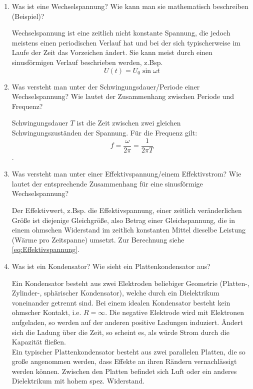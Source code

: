 \begin{enumerate}
 \item Was ist eine Wechselspannung? Wie kann man sie mathematisch beschreiben (Beispiel)? 
		\begin{solution}
			Wechselspannung ist eine zeitlich nicht konstante Spannung, die jedoch meistens einen periodischen Verlauf hat und bei der sich typischerweise im Laufe der Zeit das Vorzeichen ändert. Sie kann meist durch einen sinusförmigen Verlauf beschrieben werden, z.Bsp.
			\begin{equation*}
				U(t) = U_0 \sin\omega t
			\end{equation*}
		\end{solution}
 \item Was versteht man unter der Schwingungsdauer/Periode einer Wechselspannung? Wie lautet der Zusammenhang zwischen Periode und Frequenz?
		\begin{solution}
			Schwingungsdauer $T$ ist die Zeit zwischen zwei gleichen Schwingungszuständen der Spannung. Für die Frequenz gilt: $$f = \frac{\omega}{2\pi} = \frac{1}{2\pi T}$$.
		\end{solution}
 \item Was versteht man unter einer Effektivspannung/einem Effektivstrom? Wie lautet der entsprechende Zusammenhang für eine sinusförmige Wechselspannung?
		\begin{solution}
			Der Effektivwert, z.Bsp. die Effektivspannung, einer zeitlich veränderlichen Größe ist diejenige Gleichgröße, also Betrag einer Gleichspannung, die in einem ohmschen Widerstand im zeitlich konstanten Mittel dieselbe Leistung (Wärme pro Zeitspanne) umsetzt. Zur Berechnung siehe \ref{eq:Effektivspannung}.
		\end{solution}
 \item Was ist ein Kondensator? Wie sieht ein Plattenkondensator aus?
		\begin{solution}
			Ein Kondensator besteht aus zwei Elektroden beliebiger Geometrie (Platten-, Zylinder-, sphärischer Kondensator), welche durch ein Dielektrikum voneinander getrennt sind. Bei einem idealen Kondensator besteht kein ohmscher Kontakt, i.e. $R=\infty$. Die negative Elektrode wird mit Elektronen aufgeladen, so werden auf der anderen positive Ladungen induziert. Ändert sich die Ladung über die Zeit, so scheint es, als würde Strom durch die Kapazität fließen.\\
			Ein typischer Plattenkondensator besteht aus zwei parallelen Platten, die so große angenommen werden, dass Effekte an ihren Rändern vernachlässigt werden können. Zwischen den Platten befindet sich Luft oder ein anderes Dielektrikum mit hohem spez. Widerstand.

\end{solution}
\end{enumerate}
